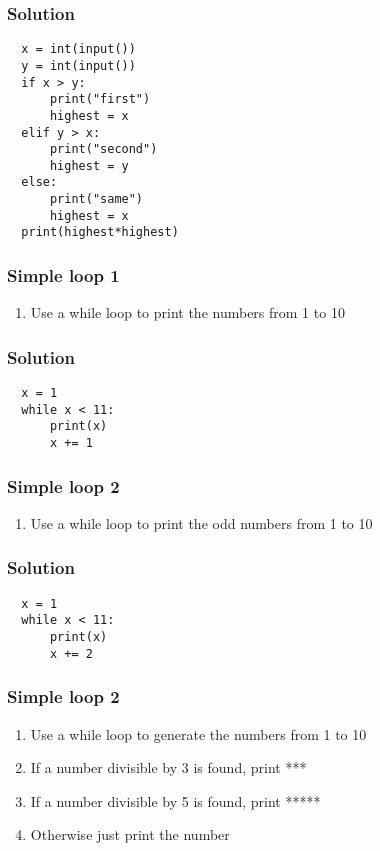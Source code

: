 \documentclass[14pt,compress]{beamer}
\begin{document}
\begin{frame}
\frametitle{Solution}
\begin{lstlisting}
  x = int(input())
  y = int(input())
  if x > y:
      print("first")
      highest = x
  elif y > x:
      print("second")
      highest = y
  else:
      print("same")
      highest = x
  print(highest*highest)
\end{lstlisting}
\end{frame}


\begin{frame}[plain]
  \frametitle{Simple  loop 1}
  \begin{enumerate}
  \item Use a while loop to print the numbers from 1 to 10
  \end{enumerate}
\end{frame}

\begin{frame}
\frametitle{Solution}
\begin{lstlisting}
  x = 1
  while x < 11:
      print(x)
      x += 1
\end{lstlisting}
\end{frame}

\begin{frame}[plain]
  \frametitle{Simple  loop 2}
  \begin{enumerate}
  \item Use a while loop to print the odd numbers from 1 to 10
  \end{enumerate}
\end{frame}

\begin{frame}
\frametitle{Solution}
\begin{lstlisting}
  x = 1
  while x < 11:
      print(x)
      x += 2
\end{lstlisting}
\end{frame}

\begin{frame}[plain]
  \frametitle{Simple  loop 2}
  \begin{enumerate}
  \item Use a while loop to generate the numbers from 1 to 10
  \item If a number divisible by 3 is found, print ***
  \item If a number divisible by 5 is found, print *****
  \item Otherwise just print the number
  \end{enumerate}
\end{frame}
\end{document}
